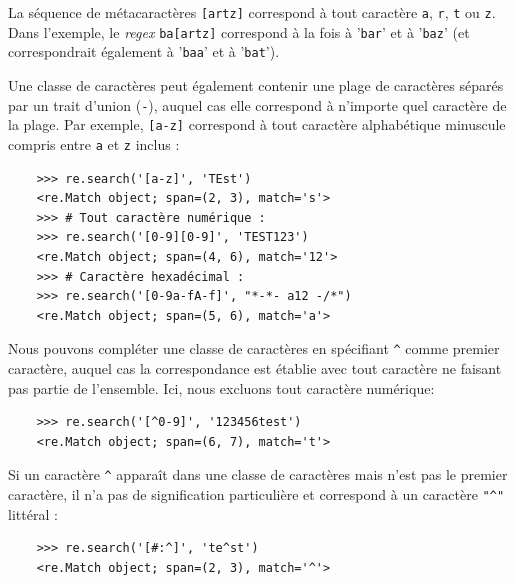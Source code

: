\documentclass[a4paper,12pt]{book}
\begin{document}
La séquence de métacaractères \texttt{[artz]} correspond à tout caractère \og \texttt{a}\fg{}, \og \texttt{r}\fg{}, \og \texttt{t}\fg{} ou \og \texttt{z}\fg{}. Dans l'exemple, le \textit{regex} \texttt{ba[artz]} correspond à la fois à '\texttt{bar}' et à '\texttt{baz}' (et correspondrait également à '\texttt{baa}' et à '\texttt{bat}').
\medskip

Une classe de caractères peut également contenir une plage de caractères séparés par un trait d'union (\texttt{-}), auquel cas elle correspond à n'importe quel caractère de la plage. Par exemple, \texttt{[a-z]} correspond à tout caractère alphabétique minuscule compris entre \og \texttt{a}\fg{} et \og \texttt{z}\fg{} inclus :
\begin{verbatim}
    >>> re.search('[a-z]', 'TEst')
    <re.Match object; span=(2, 3), match='s'>
    >>> # Tout caractère numérique :
    >>> re.search('[0-9][0-9]', 'TEST123')  
    <re.Match object; span=(4, 6), match='12'>
    >>> # Caractère hexadécimal :
    >>> re.search('[0-9a-fA-f]', "*-*- a12 -/*")  
    <re.Match object; span=(5, 6), match='a'>
\end{verbatim}
\medskip

Nous pouvons compléter une classe de caractères en spécifiant \texttt{\^} comme premier caractère, auquel cas la correspondance est établie avec tout caractère ne faisant pas partie de l'ensemble. Ici, nous excluons tout caractère numérique:
\begin{verbatim}
    >>> re.search('[^0-9]', '123456test')
    <re.Match object; span=(6, 7), match='t'>
\end{verbatim}
\medskip

Si un caractère \texttt{\^} apparaît dans une classe de caractères mais n'est pas le premier caractère, il n'a pas de signification particulière et correspond à un caractère \texttt{"\^{}"} littéral :
\begin{verbatim}
    >>> re.search('[#:^]', 'te^st')
    <re.Match object; span=(2, 3), match='^'>
\end{verbatim}
\medskip
\end{document}

